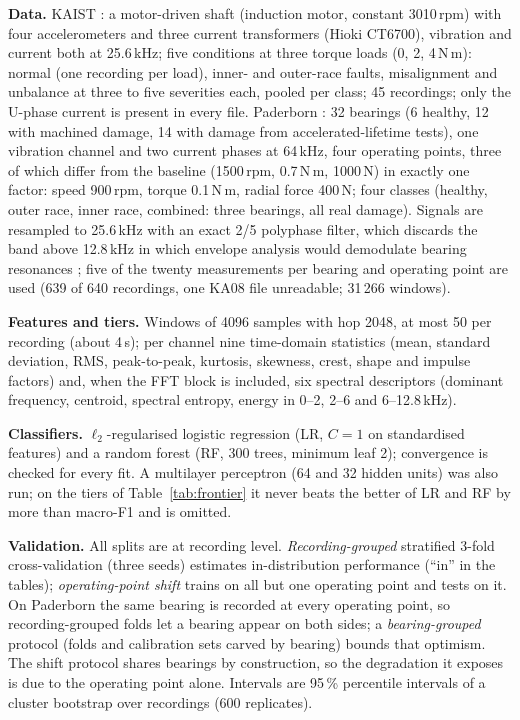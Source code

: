 \documentclass{ifacconf}
\begin{document}
\textbf{Data.} KAIST \citep{jung2023kaist}: a motor-driven shaft (induction motor, constant 3010\,rpm) with four accelerometers and three current transformers (Hioki CT6700), vibration and current both at 25.6\,kHz; five conditions at three torque loads (0, 2, 4\,N\,m): normal (one recording per load), inner- and outer-race faults, misalignment and unbalance at three to five severities each, pooled per class; 45 recordings; only the U-phase current is present in every file. Paderborn \citep{lessmeier2016paderborn}: 32 bearings (6 healthy, 12 with machined damage, 14 with damage from accelerated-lifetime tests), one vibration channel and two current phases at 64\,kHz, four operating points, three of which differ from the baseline (1500\,rpm, 0.7\,N\,m, 1000\,N) in exactly one factor: speed 900\,rpm, torque 0.1\,N\,m, radial force 400\,N; four classes (healthy, outer race, inner race, combined: three bearings, all real damage). Signals are resampled to 25.6\,kHz with an exact 2/5 polyphase filter, which discards the band above 12.8\,kHz in which envelope analysis would demodulate bearing resonances \citep{randall2011tutorial}; five of the twenty measurements per bearing and operating point are used (639 of 640 recordings, one KA08 file unreadable; 31\,266 windows).

\textbf{Features and tiers.} Windows of 4096 samples with hop 2048, at most 50 per recording (about 4\,s); per channel nine time-domain statistics (mean, standard deviation, RMS, peak-to-peak, kurtosis, skewness, crest, shape and impulse factors) and, when the FFT block is included, six spectral descriptors (dominant frequency, centroid, spectral entropy, energy in 0--2, 2--6 and 6--12.8\,kHz).

\textbf{Classifiers.} $\ell_2$-regularised logistic regression (LR, $C=1$ on standardised features) and a random forest (RF, 300 trees, minimum leaf 2); convergence is checked for every fit. A multilayer perceptron (64 and 32 hidden units) was also run; on the tiers of Table~\ref{tab:frontier} it never beats the better of LR and RF by more than \mlpDeficit{} macro-F1 and is omitted.

\textbf{Validation.} All splits are at recording level. \emph{Recording-grouped} stratified 3-fold cross-validation (three seeds) estimates in-distribution performance (``in'' in the tables); \emph{operating-point shift} trains on all but one operating point and tests on it. On Paderborn the same bearing is recorded at every operating point, so recording-grouped folds let a bearing appear on both sides; a \emph{bearing-grouped} protocol (folds and calibration sets carved by bearing) bounds that optimism. The shift protocol shares bearings by construction, so the degradation it exposes is due to the operating point alone. Intervals are 95\,\% percentile intervals of a cluster bootstrap over recordings (600 replicates).
\end{document}
